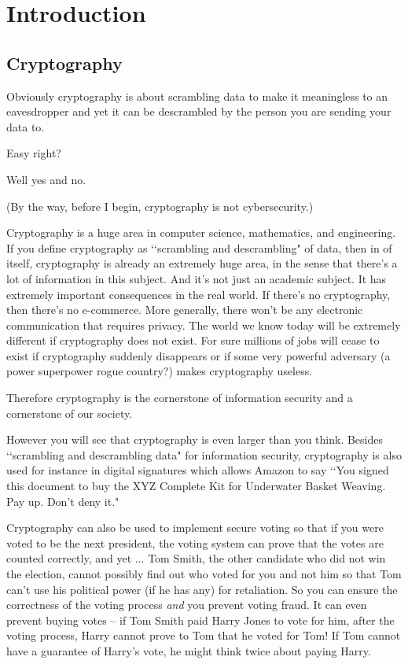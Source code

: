 \chapter{Introduction}

\section{Cryptography}

Obviously cryptography is about scrambling data to make it
meaningless to an eavesdropper and yet it can be descrambled by
the person you are sending your data to.

Easy right?

Well yes and no.

(By the way, before I begin, cryptography is not cybersecurity.)

Cryptography is a huge area in computer science, mathematics,
and engineering.
If you define cryptography as \lq\lq scrambling and descrambling"
of data, then in of itself, cryptography is already an extremely huge
area, in the sense that there's a lot of information in this subject.
And it's not just an academic subject.
It has extremely important consequences in the real world.
If there's no cryptography, then
there's no e-commerce.
More generally, there won't be any electronic communication
that requires privacy.
The world we know today will be extremely different if
cryptography does not exist.
For sure millions of jobs will cease to exist if
cryptography suddenly disappears or if some very powerful
adversary (a power superpower rogue country?) makes
cryptography useless.

Therefore cryptography is the cornerstone of
information security and a cornerstone of our society.

However you will see that cryptography is even larger than you think.
Besides \lq\lq scrambling and descrambling data" for
information security,
cryptography is also used for instance
in digital signatures which allows Amazon to 
say \lq\lq You signed this document to buy the XYZ
Complete Kit for Underwater Basket Weaving. Pay up. Don't deny it."

Cryptography can also be used to
implement secure voting 
so that if you were voted to be
the next president, the voting system can prove that the votes
are counted correctly,
and yet ... Tom Smith, the other candidate who did not win the election,
cannot possibly find out who voted for you and not him
so that Tom can't use his political power (if he has any) for retaliation.
So you can ensure the correctness of the voting process
\textit{and}
you prevent voting fraud.
It can even prevent buying votes --
if Tom Smith paid Harry Jones to vote for him,
after the voting process,
Harry cannot prove to Tom that he voted for Tom!
If Tom cannot have a guarantee of Harry's vote, he might think twice about
paying Harry.

